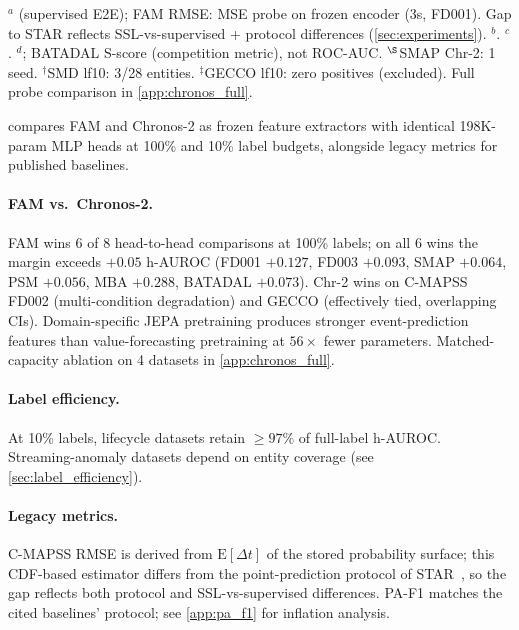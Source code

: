 \documentclass{article}
\begin{document}
\begin{table}[t]
\begin{tabular*}{\columnwidth}{@{\extracolsep{\fill}}llccccc@{}}
    \bottomrule
  \end{tabular*}
  \vspace{2pt}
  \begin{minipage}{\linewidth}
    \scriptsize
    $^{a}$\citet{fan2024star} (supervised E2E); FAM RMSE: MSE probe on frozen encoder (3s, FD001). Gap to STAR reflects SSL-vs-supervised + protocol differences (\cref{sec:experiments}). $^{b}$\citet{mtsjepa2026}. $^{c}$\citet{xu2022anomalytransformer}. $^{d}$\citet{batadal2018}; BATADAL S-score (competition metric), not ROC-AUC. $^{\S}$SMAP Chr-2: 1 seed. $^{\dagger}$SMD lf10: 3/28 entities. $^{\ddagger}$GECCO lf10: zero positives (excluded). Full probe comparison in \cref{app:chronos_full}.
  \end{minipage}
\end{table}

 compares FAM and Chronos-2 as frozen feature extractors with identical 198K-param MLP heads at 100\% and 10\% label budgets, alongside legacy metrics for published baselines.

\paragraph{FAM vs.\ Chronos-2.} FAM wins 6 of 8 head-to-head comparisons at 100\% labels; on all 6 wins the margin exceeds $+0.05$ h-AUROC (FD001 $+0.127$, FD003 $+0.093$, SMAP $+0.064$, PSM $+0.056$, MBA $+0.288$, BATADAL $+0.073$). Chr-2 wins on C-MAPSS FD002 (multi-condition degradation) and GECCO (effectively tied, overlapping CIs). Domain-specific JEPA pretraining produces stronger event-prediction features than value-forecasting pretraining at $56{\times}$ fewer parameters. Matched-capacity ablation on 4 datasets in \cref{app:chronos_full}.

\paragraph{Label efficiency.} At 10\% labels, lifecycle datasets retain ${\geq}97\%$ of full-label h-AUROC. Streaming-anomaly datasets depend on entity coverage (see \cref{sec:label_efficiency}).

\paragraph{Legacy metrics.} C-MAPSS RMSE is derived from $\text{E}[\Delta t]$ of the stored probability surface; this CDF-based estimator differs from the point-prediction protocol of STAR~\citep{fan2024star}, so the gap reflects both protocol and SSL-vs-supervised differences. PA-F1 matches the cited baselines' protocol; see \cref{app:pa_f1} for inflation analysis.
\end{document}
